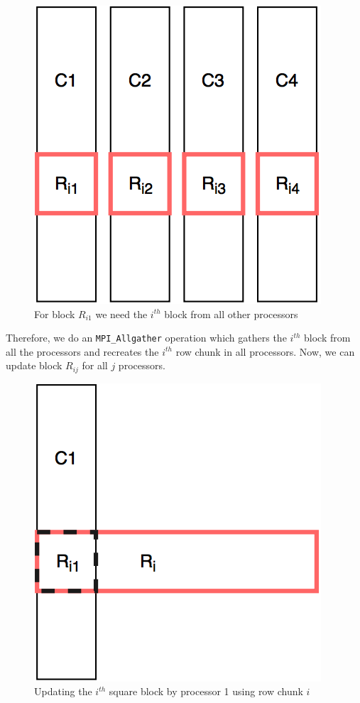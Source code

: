 \documentclass[11pt]{article}
\begin{document}
\begin{figure}[H]
\centering
\includegraphics[scale=0.25]{allgather.png}
\caption{For block $R_{i1}$ we need the $i^{th}$ block from all other processors}
\label{fig:allgather}
\end{figure}

Therefore, we do an \texttt{MPI\_Allgather} operation which gathers the $i^{th}$ block from all the processors and recreates the $i^{th}$ row chunk in all processors. Now, we can update block $R_{ij}$ for all $j$ processors. 

\begin{figure}[H]
\centering
\includegraphics[scale=0.25]{row_col.png}
\caption{Updating the $i^{th}$ square block by processor 1 using row chunk $i$}
\label{fig:row_col}
\end{figure}
\end{document}
